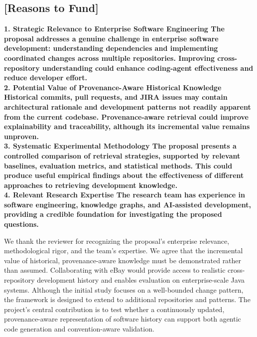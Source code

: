\documentclass[11pt]{article}
\begin{document}
\subsection*{[Reasons to Fund]}
\textbf{1. Strategic Relevance to Enterprise Software Engineering
The proposal addresses a genuine challenge in enterprise software development: understanding dependencies and implementing coordinated changes across multiple repositories. Improving cross-repository understanding could enhance coding-agent effectiveness and reduce developer effort.\\
2. Potential Value of Provenance-Aware Historical Knowledge
Historical commits, pull requests, and JIRA issues may contain architectural rationale and development patterns not readily apparent from the current codebase. Provenance-aware retrieval could improve explainability and traceability, although its incremental value remains unproven.\\
3. Systematic Experimental Methodology
The proposal presents a controlled comparison of retrieval strategies, supported by relevant baselines, evaluation metrics, and statistical methods. This could produce useful empirical findings about the effectiveness of different approaches to retrieving development knowledge.\\
4. Relevant Research Expertise
The research team has experience in software engineering, knowledge graphs, and AI-assisted development, providing a credible foundation for investigating the proposed questions.}

We thank the reviewer for recognizing the proposal’s enterprise relevance, methodological rigor, and the team’s expertise. We agree that the incremental value of historical, provenance-aware knowledge must be demonstrated rather than assumed. Collaborating with eBay would provide access to realistic cross-repository development history and enables evaluation on enterprise-scale Java systems. Although the initial study focuses on a well-bounded change pattern, the framework is designed to extend to additional repositories and patterns. The project’s central contribution is to test whether a continuously updated, provenance-aware representation of software history can support both agentic code generation and convention-aware validation.
\end{document}
